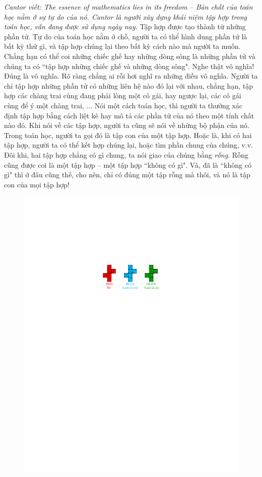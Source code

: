 \begin{multicols}{2}	
	\textit{Cantor viết: The essence of mathematics lies in its freedom -- Bản chất của toán học nằm ở sự tự do của nó. Cantor là người xây dựng khái niệm tập hợp trong toán học, vẫn đang được sử dụng ngày nay.} 
	\vskip 0.1cm
	Tập hợp được tạo thành từ những phần tử. Tự do của toán học nằm ở chỗ, người ta có thể hình dung phần tử là bất kỳ thứ gì, và tập hợp chúng lại theo bất kỳ cách nào mà người ta muốn. Chẳng hạn có thể coi những chiếc ghế hay những dòng sông là những phần tử và chúng ta có ``tập hợp những chiếc ghế và những dòng sông". 
	\vskip 0.1cm
	Nghe thật vô nghĩa!
	\vskip 0.1cm
	Đúng là vô nghĩa. Rõ ràng chẳng ai rỗi hơi nghĩ ra những điều vô nghĩa. Người ta chỉ tập hợp những phần tử có những liên hệ nào đó lại với nhau, chẳng hạn, tập hợp các chàng trai cùng đang phải lòng một cô gái, hay ngược lại, các cô gái cùng để ý một chàng trai, ... Nói một cách toán học, thì người ta thường xác định tập hợp bằng cách liệt kê hay mô tả các phần tử của nó theo một tính chất nào đó.
	\vskip 0.1cm
	Khi nói về các tập hợp, người ta cũng sẽ nói về những bộ phận của nó. Trong toán học, người ta gọi đó là tập con của một tập hợp. Hoặc là, khi có hai tập hợp, người ta có thể kết hợp chúng lại, hoặc tìm phần chung của chúng, v.v. Đôi khi, hai tập hợp chẳng có gì chung, ta nói giao của chúng bằng \textit{rỗng}. Rỗng cũng được coi là một tập hợp -- một tập hợp ``không có gì". Và, đã là ``không có gì" thì ở đâu cũng thế, cho nên, chỉ có đúng một tập rỗng mà thôi, và nó là tập con của mọi tập hợp! 
	\begin{figure}[H]
		\vspace*{-5pt}
		\centering
		\captionsetup{labelformat= empty, justification=centering}
		\includegraphics[width= 1\linewidth]{1}

\end{figure}
\end{multicols}
